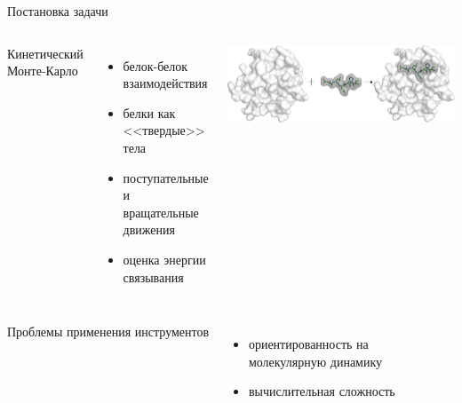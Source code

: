 \documentclass[sans,aspectratio=169]{beamer}
\begin{document}
\begin{frame}{Постановка задачи}
	\fontsize{11}{15}\selectfont
	\hangindent=-0.5cm
	 \noindent
	\setlength{\leftmargini}{20pt}
	


\begin{columns}[c]
	
	\vspace{4pt}
	
	Кинетический Монте-Карло
	\begin{itemize}
	\setlength\itemsep{1mm}
	\item белок-белок взаимодействия
	\item белки как <<твердые>> тела
	\item поступательные и вращательные \\ движения
	\item оценка энергии связывания
	\end{itemize}

	\vspace{-2pt}
	\begin{center}
		\includegraphics[width=1.0\textwidth]{images/plc.png}
	\end{center}
\end{columns}

\vspace{5pt}

\begin{columns}[c]
	
	\vspace{-4pt}
		
	Проблемы применения инструментов
	\begin{itemize}
		\setlength\itemsep{1mm}
		\item ориентированность на \\ молекулярную динамику
		\item вычислительная сложность 
	\end{itemize}
	

\end{columns}
\end{frame}
\end{document}
